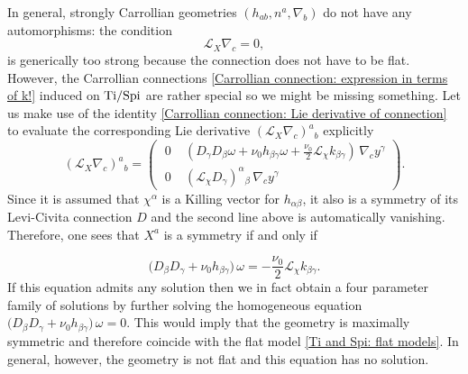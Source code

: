 \documentclass[a4paper, 10pt]{article}
\theoremstyle{remark}
\newcommand{\Ti}{\textnormal{Ti}}
\newcommand{\Spi}{\textnormal{Spi}}
\begin{document}
In general, strongly Carrollian geometries $(h_{ab}, n^a ,\nabla_b)$ do not have any automorphisms: the condition 
\begin{equation*}
    \mathcal{L}_X \nabla_c = 0,
\end{equation*}
is generically too strong because the connection does not have to be flat. However, the Carrollian connections \eqref{Carrollian connection: expression in terms of k!} induced on $\Ti/\Spi$ are rather special so we might be missing something. Let us make use of the identity \eqref{Carrollian connection: Lie derivative of connection} to evaluate the corresponding Lie derivative $(\mathcal{L}_X \nabla_c)^a{}_b$ explicitly
\begin{equation}\label{Carrollian connection: generic transformation of the connection}
(\mathcal{L}_X \nabla_c)^a{}_{b}=\begin{pmatrix}\;0\; & (D_\gamma D_\beta \omega +\nu_0 h_{\beta\gamma}\omega + \frac{\nu_0}{2}\mathcal{L}_\chi k_{\beta\gamma})\, \nabla_c y^\gamma \\[0.2em] \;0\; & (\mathcal{L}_\chi D_\gamma)^\alpha{}_\beta \,\nabla_c y^\gamma \end{pmatrix}.
\end{equation}
Since it is assumed that $\chi^{\alpha}$ is a Killing vector for $h_{\alpha\beta}$, it also is a symmetry of its Levi-Civita connection $D$ and the second line above is automatically vanishing. Therefore, one sees that $X^a$ is a symmetry if and only if

\begin{equation}\label{Carrollian connection: full automorphisms}
 \big(D_\beta D_{\gamma} + \nu_0 h_{\beta\gamma}\Big)\,\omega  = -\frac{\nu_0}{2}  \mathcal{L}_\chi k_{\beta\gamma}.
\end{equation}
If this equation admits any solution then we in fact obtain a four parameter family of solutions by further solving the homogeneous equation $\big(D_\beta D_{\gamma} + \nu_0 h_{\beta\gamma}\Big)\,\omega  = 0$. This would imply that the geometry is maximally symmetric and therefore coincide with the flat model \eqref{Ti and Spi: flat models}. In general, however, the geometry is not flat and this equation has no solution. 
\end{document}
